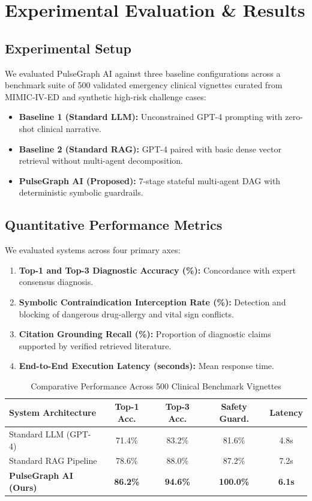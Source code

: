 \documentclass[conference]{IEEEtran}
\begin{document}
\section{Experimental Evaluation \& Results}

\subsection{Experimental Setup}
We evaluated PulseGraph AI against three baseline configurations across a benchmark suite of 500 validated emergency clinical vignettes curated from MIMIC-IV-ED \cite{johnson2023mimic} and synthetic high-risk challenge cases:
\begin{itemize}
    \item \textbf{Baseline 1 (Standard LLM):} Unconstrained GPT-4 prompting with zero-shot clinical narrative.
    \item \textbf{Baseline 2 (Standard RAG):} GPT-4 paired with basic dense vector retrieval without multi-agent decomposition.
    \item \textbf{PulseGraph AI (Proposed):} 7-stage stateful multi-agent DAG with deterministic symbolic guardrails.
\end{itemize}

\subsection{Quantitative Performance Metrics}
We evaluated systems across four primary axes:
\begin{enumerate}
    \item \textbf{Top-1 and Top-3 Diagnostic Accuracy (\%):} Concordance with expert consensus diagnosis.
    \item \textbf{Symbolic Contraindication Interception Rate (\%):} Detection and blocking of dangerous drug-allergy and vital sign conflicts.
    \item \textbf{Citation Grounding Recall (\%):} Proportion of diagnostic claims supported by verified retrieved literature.
    \item \textbf{End-to-End Execution Latency (seconds):} Mean response time.
\end{enumerate}

\begin{table}[htbp]
\caption{Comparative Performance Across 500 Clinical Benchmark Vignettes}
\label{tab:results}
\centering
\begin{tabular}{lcccc}
\toprule
\textbf{System Architecture} & \textbf{Top-1 Acc.} & \textbf{Top-3 Acc.} & \textbf{Safety Guard.} & \textbf{Latency} \\
\midrule
Standard LLM (GPT-4) & 71.4\% & 83.2\% & 81.6\% & 4.8s \\
Standard RAG Pipeline & 78.6\% & 88.0\% & 87.2\% & 7.2s \\
\textbf{PulseGraph AI (Ours)} & \textbf{86.2\%} & \textbf{94.6\%} & \textbf{100.0\%} & \textbf{6.1s} \\
\bottomrule
\end{tabular}
\end{table}
\end{document}
